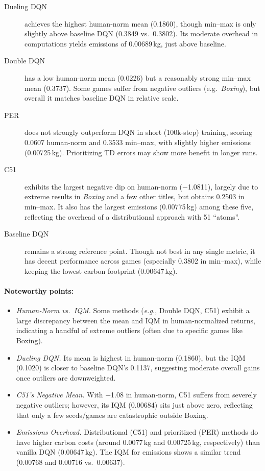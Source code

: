 \begin{description}
	\item[Dueling DQN] achieves the highest human-norm mean (\num{0.1860}), though min--max is only slightly above baseline DQN (\num{0.3849} vs.\ \num{0.3802}). Its moderate overhead in computations yields emissions of \num{0.00689}\,kg, just above baseline.
	\item[Double DQN] has a low human-norm mean (\num{0.0226}) but a reasonably strong min--max mean (\num{0.3737}). Some games suffer from negative outliers (e.g.\ \emph{Boxing}), but overall it matches baseline DQN in relative scale.
	\item[PER] does not strongly outperform DQN in short (100k-step) training, scoring \num{0.0607} human-norm and \num{0.3533} min--max, with slightly higher emissions (\num{0.00725}\,kg). Prioritizing TD errors may show more benefit in longer runs.
	\item[C51] exhibits the largest negative dip on human-norm (\num{-1.0811}), largely due to extreme results in \emph{Boxing} and a few other titles, but obtains \num{0.2503} in min--max. It also has the largest emissions (\num{0.00775}\,kg) among these five, reflecting the overhead of a distributional approach with 51 “atoms”.
	\item[Baseline DQN] remains a strong reference point. Though not best in any single metric, it has decent performance across games (especially \num{0.3802} in min--max), while keeping the lowest carbon footprint (\num{0.00647}\,kg).
\end{description}

\paragraph{Noteworthy points:}
\begin{itemize}
	\item \emph{Human‐Norm vs.\ IQM.} 
	Some methods (\emph{e.g.}, Double DQN, C51) 
	exhibit a large discrepancy between the mean and IQM in human‐normalized returns, 
	indicating a handful of extreme outliers (often due to specific games like Boxing).
	\item \emph{Dueling DQN.} 
	Its mean is highest in human‐norm (\num{0.1860}), 
	but the IQM (\num{0.1020}) is closer to baseline DQN's \num{0.1137}, 
	suggesting moderate overall gains once outliers are downweighted.
	\item \emph{C51's Negative Mean.} 
	With \num{-1.08} in human‐norm, C51 suffers from severely negative outliers; 
	however, its IQM (\num{0.00684}) sits just above zero, reflecting that only a few seeds/games 
	are catastrophic outside Boxing.
	\item \emph{Emissions Overhead.} 
	Distributional (C51) and prioritized (PER) methods do have higher carbon costs 
	(around \num{0.0077}\,kg and \num{0.00725}\,kg, respectively) than vanilla DQN (\num{0.00647}\,kg). 
	The IQM for emissions shows a similar trend (\num{0.00768} and \num{0.00716} vs.\ \num{0.00637}).
\end{itemize}

